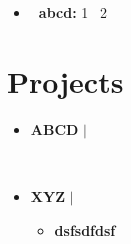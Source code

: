 \documentclass[letterpaper,5pt]{article}
\begin{document}
        \begin{itemize}[leftmargin=0.15in,label={}]
        \item{
          
            \textbf{\ abcd: } \textbullet{} 1 \,\textbullet{} 2 \
            \newline
            \vspace*{-6mm}  
          
        }

        \end{itemize}

        
    
    \section{Projects}
    
        \begin{itemize}[leftmargin=0.15in,label={}]
        
          \item{
            \textbf{ABCD} $|$  
            \hfill 
          }
            \begin{itemize}
            \vspace{-5pt}
             
            \vspace{-5pt}
                 
            \   
            \end{itemize}
          
          \item{
            \textbf{XYZ} $|$  
            \hfill 
          }
            \begin{itemize}
            \vspace{-5pt}
             
            \vspace{-5pt}
            \item[\textbullet{}]\textbf{dsfsdfdsf}      
            \   
            \end{itemize}
          
          
      \end{itemize}
      \vspace*{-6mm}  
        


    
      
\end{document}
